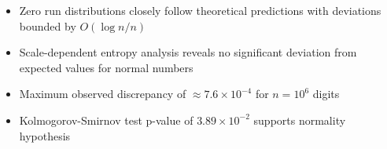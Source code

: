 \begin{itemize}
    \item Zero run distributions closely follow theoretical predictions with deviations bounded by $O(\log n/n)$
    \item Scale-dependent entropy analysis reveals no significant deviation from expected values for normal numbers
    \item Maximum observed discrepancy of $\approx 7.6 \times 10^{-4}$ for $n = 10^6$ digits
    \item Kolmogorov-Smirnov test p-value of $3.89 \times 10^{-2}$ supports normality hypothesis
\end{itemize}

